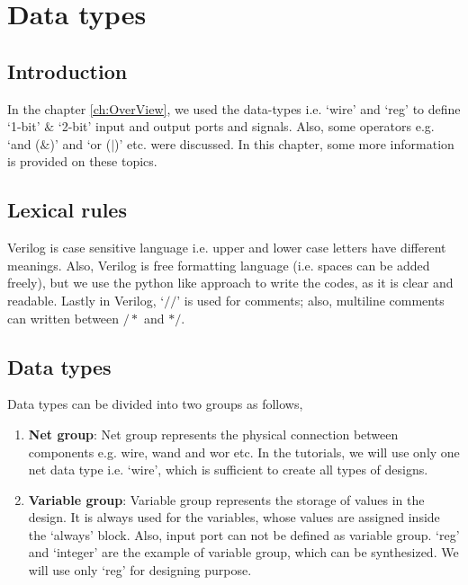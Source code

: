 \chapter{Data types} \label{ch:Datatypes}

\graphicspath{{Chapters/Datatypes/Figures/}}

\section{Introduction}

In the chapter \ref{ch:OverView}, we used the data-types i.e. `wire' and `reg' to define `1-bit' $\&$ `2-bit' input and output ports and signals. Also, some operators e.g. `and ($\&$)' and `or ($|$)' etc. were discussed. In this chapter, some more information is provided on these topics.

\section{Lexical rules}
Verilog is case sensitive language i.e. upper and lower case letters have different meanings. Also, Verilog is free formatting language (i.e. spaces can be added freely), but we use the python like approach to write the codes, as it is clear and readable. Lastly in Verilog, `$//$' is used for comments; also, multiline comments can written between $/* $ and $*/$. 

\section{Data types}\label{sec:DataType}
Data types can be divided into two groups as follows, 
\begin{enumerate}
	\item \textbf{Net group}: Net group represents the physical connection between components e.g. wire, wand and wor etc. In the tutorials, we will use only one net data type i.e. `wire', which is sufficient to create all types of designs. 
	
	\item \textbf{Variable group}: Variable group represents the storage of values in the design. It is always used for the variables, whose values are assigned inside the `always' block. Also, input port can not be defined as variable group. `reg' and `integer' are the example of variable group, which can be synthesized. We will use only `reg' for designing purpose.   
\end{enumerate}

